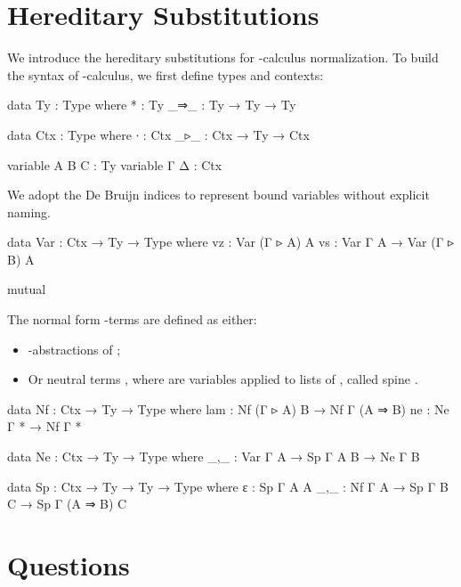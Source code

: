 \section{Hereditary Substitutions}

We introduce the hereditary substitutions for \lambda-calculus normalization. To build the syntax of \lambda-calculus, we first define types and contexts:

\begin{code}
data Ty : Type where
  *   : Ty
  _⇒_ : Ty → Ty → Ty

data Ctx : Type where
  ∙   : Ctx
  _▹_ : Ctx → Ty → Ctx
\end{code}

\begin{code}[hide]
variable A B C : Ty
variable Γ Δ : Ctx
\end{code}

We adopt the De Bruijn indices to represent bound variables without explicit naming.

\begin{code}
data Var : Ctx → Ty → Type where
  vz : Var (Γ ▹ A) A
  vs : Var Γ A → Var (Γ ▹ B) A
\end{code}

\begin{code}[hide]
mutual
\end{code}

The normal form \lambda-terms  are defined as either:

\begin{itemize}
  \item{\lambda-abstractions of ;}
  \item{Or neutral terms , where  are variables  applied to lists of , called spine }.
\end{itemize}

\begin{code}
  data Nf : Ctx → Ty → Type where
    lam : Nf (Γ ▹ A) B → Nf Γ (A ⇒ B)
    ne  : Ne Γ * → Nf Γ *

  data Ne : Ctx → Ty → Type where
    _,_ : Var Γ A → Sp Γ A B → Ne Γ B

  data Sp : Ctx → Ty → Ty → Type where
    ε   : Sp Γ A A
    _,_ : Nf Γ A → Sp Γ B C → Sp Γ (A ⇒ B) C
\end{code}

\section{Questions}


